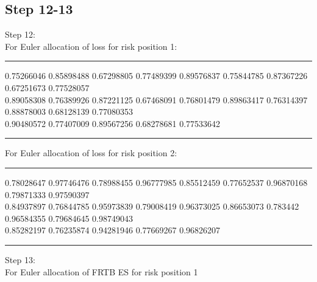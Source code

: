 \documentclass{article}
\begin{document}
\subsection*{Step 12-13}
Step 12:\\
For Euler allocation of loss for risk position 1:\\
\hrule \vspace{5pt}
 0.75266046 0.85898488 0.67298805 0.77489399  
 0.89576837 0.75844785 0.87367226 0.67251673 0.77528057 \\
 0.89058308 0.76389926 0.87221125 0.67468091 0.76801479 
 0.89863417 0.76314397 0.88878003 0.68128139 0.77080353 \\
 0.90480572 0.77407009 0.89567256 0.68278681 0.77533642\\
\hrule \vspace{5pt}
\noindent For Euler allocation of loss for risk position 2:\\
\hrule \vspace{5pt}
 0.78028647 0.97746476 0.78988455 0.96777985  
 0.85512459 0.77652537 0.96870168 0.79871333 0.97590397 \\
 0.84937897 0.76844785 0.95973839 0.79008419 0.96373025 
 0.86653073 0.783442   0.96584355 0.79684645 0.98749043 \\
 0.85282197 0.76235874 0.94281946 0.77669267 0.96826207 \\
\hrule \vspace{5pt}
\vspace{15pt}
\noindent Step 13:\\
For Euler allocation of FRTB ES for risk position 1
\begin{table}[H]
  \label{tab:my-tab1}
  \end{table}
\end{document}
